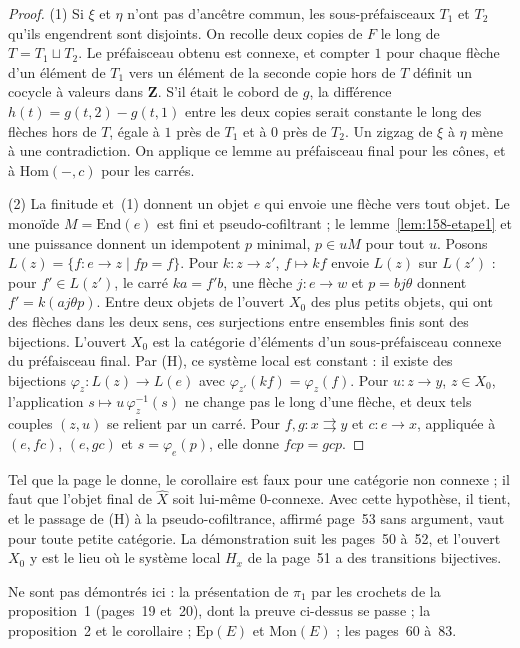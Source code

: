 \begin{proof}
(1) Si $\xi$ et $\eta$ n'ont pas d'ancêtre commun, les sous-préfaisceaux $T_1$ et $T_2$ qu'ils engendrent sont disjoints. On recolle deux copies de $F$ le long de $T = T_1 \sqcup T_2$. Le préfaisceau obtenu est connexe, et compter $1$ pour chaque flèche d'un élément de $T_1$ vers un élément de la seconde copie hors de $T$ définit un cocycle à valeurs dans $\mathbf Z$. S'il était le cobord de $g$, la différence $h(t) = g(t, 2) - g(t, 1)$ entre les deux copies serait constante le long des flèches hors de $T$, égale à $1$ près de $T_1$ et à $0$ près de $T_2$. Un zigzag de $\xi$ à $\eta$ mène à une contradiction. On applique ce lemme au préfaisceau final pour les cônes, et à $\mathrm{Hom}(-, c)$ pour les carrés.

(2) La finitude et~(1) donnent un objet $e$ qui envoie une flèche vers tout objet. Le monoïde $M = \mathrm{End}(e)$ est fini et pseudo-cofiltrant ; le lemme~\ref{lem:158-etape1} et une puissance donnent un idempotent $p$ minimal, $p \in uM$ pour tout $u$. Posons $L(z) = \{f : e \to z \mid fp = f\}$. Pour $k : z \to z'$, $f \mapsto kf$ envoie $L(z)$ sur $L(z')$ : pour $f' \in L(z')$, le carré $ka = f'b$, une flèche $j : e \to w$ et $p = bj\theta$ donnent $f' = k(aj\theta p)$. Entre deux objets de l'ouvert $X_0$ des plus petits objets, qui ont des flèches dans les deux sens, ces surjections entre ensembles finis sont des bijections. L'ouvert $X_0$ est la catégorie d'éléments d'un sous-préfaisceau connexe du préfaisceau final. Par (H), ce système local est constant : il existe des bijections $\varphi_z : L(z) \to L(e)$ avec $\varphi_{z'}(kf) = \varphi_z(f)$. Pour $u : z \to y$, $z \in X_0$, l'application $s \mapsto u\,\varphi_z^{-1}(s)$ ne change pas le long d'une flèche, et deux tels couples $(z, u)$ se relient par un carré. Pour $f, g : x \rightrightarrows y$ et $c : e \to x$, appliquée à $(e, fc)$, $(e, gc)$ et $s = \varphi_e(p)$, elle donne $fcp = gcp$.
\end{proof}

\begin{remarque}
Tel que la page le donne, le corollaire est faux pour une catégorie non connexe ; il faut que l'objet final de $\widehat X$ soit lui-même $0$-connexe. Avec cette hypothèse, il tient, et le passage de (H) à la pseudo-cofiltrance, affirmé page~53 sans argument, vaut pour toute petite catégorie. La démonstration suit les pages~50 à~52, et l'ouvert $X_0$ y est le lieu où le système local $H_x$ de la page~51 a des transitions bijectives.
\end{remarque}

Ne sont pas démontrés ici : la présentation de $\pi_1$ par les crochets de la proposition~1 (pages~19 et~20), dont la preuve ci-dessus se passe ; la proposition~2  et le corollaire  ; $\mathrm{Ep}(E)$ et $\mathrm{Mon}(E)$ ; les pages~60 à~83.

